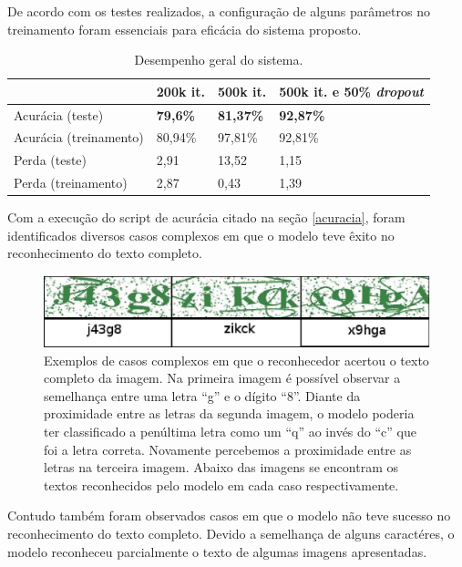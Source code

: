 De acordo com os testes realizados, a configuração de alguns
parâmetros no treinamento foram essenciais para eficácia do sistema
proposto.

\begin{table}[H]
\begin{center}
\begin{tabular}{|p{2.3cm}|p{2.3cm}|p{2.3cm}|p{2.3cm}|}
\hline
\textbf{} & \textbf{200k it.} & \textbf{500k it.} & \textbf{500k it. e 50\% \textit{dropout}} \\
\hline
Acurácia (teste) & {\bf 79,6\%} & {\bf 81,37\%} & {\bf 92,87\%} \\
\hline
Acurácia (treinamento) & 80,94\% & 97,81\% & 92,81\% \\
\hline
Perda (teste) & 2,91 & 13,52 & 1,15 \\
\hline
Perda (treinamento) & 2,87 & 0,43 & 1,39 \\
\hline
\end{tabular}
\caption{Desempenho geral do sistema.}
\label{tab:system_efficency}
\end{center}
\end{table}

Com a execução do script de acurácia citado na seção \ref{acuracia},
foram identificados diversos casos complexos em que o modelo teve
êxito no reconhecimento do texto completo.

\begin{figure}[H]
\centering
\includegraphics[scale=0.8]{imagens/complex_cases}
\caption{Exemplos de casos complexos em que o reconhecedor acertou o
  texto completo da imagem. Na primeira imagem é possível observar a
  semelhança entre uma letra ``g'' e o dígito ``8''. Diante da
  proximidade entre as letras da segunda imagem, o modelo poderia ter
  classificado a penúltima letra como um ``q'' ao invés do ``c'' que
  foi a letra correta. Novamente percebemos a proximidade entre as
  letras na terceira imagem. Abaixo das imagens se encontram os textos
  reconhecidos pelo modelo em cada caso respectivamente.}
\label{fig:complex_cases}
\end{figure}

Contudo também foram observados casos em que o modelo não teve sucesso
no reconhecimento do texto completo. Devido a semelhança de alguns
caractéres, o modelo reconheceu parcialmente o texto de algumas
imagens apresentadas.

